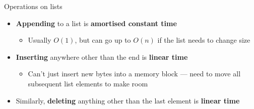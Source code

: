 \begin{frame}{Operations on lists}
	\begin{itemize}
		\pause\item \textbf{Appending} to a list is \textbf{amortised constant time}
			\begin{itemize}
				\pause\item Usually $O(1)$, but can go up to $O(n)$ if the list needs to change size
			\end{itemize}
		\pause\item \textbf{Inserting} anywhere other than the end is \textbf{linear time}
			\begin{itemize}
				\pause\item Can't just insert new bytes into a memory block ---
					need to move all subsequent list elements to make room
			\end{itemize}
		\pause\item Similarly, \textbf{deleting} anything other than the last element is \textbf{linear time}
	\end{itemize}
\end{frame}
